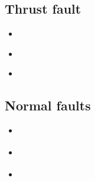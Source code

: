 \subsection{Thrust fault} 

\begin{scriptsize}
\begin{itemize}
\item[\nineteenninety] 
\textcite{moen90b} \\  %
\item[\nineteenninetytwo] 
\textcite{moln92} \\
\item[\twothousandfourteen] 
\textcite{stsc14} \\
\end{itemize}
\end{scriptsize}


\subsection{Normal faults} 


\begin{scriptsize}
\begin{itemize}
\item[\twothousand]
\textcite{heha05} 
\item[\twothousand]
\textcite{maha08} 
\item[\twothousand]
\textcite{hahe15} 
\end{itemize}
\end{scriptsize}

